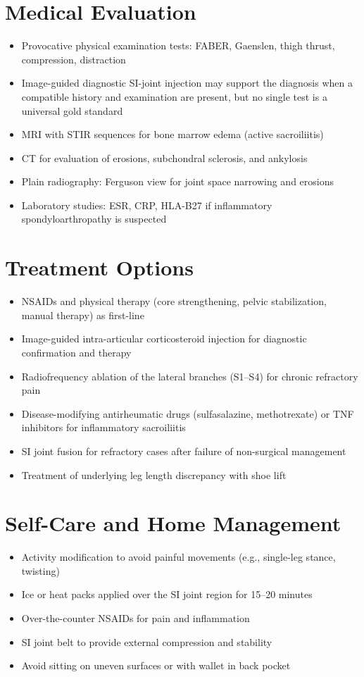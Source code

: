 \section*{Medical Evaluation}
\begin{itemize}
  \item Provocative physical examination tests: FABER, Gaenslen, thigh thrust, compression, distraction
  \item Image-guided diagnostic SI-joint injection may support the diagnosis when a compatible history and examination are present, but no single test is a universal gold standard
  \item MRI with STIR sequences for bone marrow edema (active sacroiliitis)
  \item CT for evaluation of erosions, subchondral sclerosis, and ankylosis
  \item Plain radiography: Ferguson view for joint space narrowing and erosions
  \item Laboratory studies: ESR, CRP, HLA-B27 if inflammatory spondyloarthropathy is suspected
\end{itemize}

\section*{Treatment Options}
\begin{itemize}
  \item NSAIDs and physical therapy (core strengthening, pelvic stabilization, manual therapy) as first-line
  \item Image-guided intra-articular corticosteroid injection for diagnostic confirmation and therapy
  \item Radiofrequency ablation of the lateral branches (S1--S4) for chronic refractory pain
  \item Disease-modifying antirheumatic drugs (sulfasalazine, methotrexate) or TNF inhibitors for inflammatory sacroiliitis
  \item SI joint fusion for refractory cases after failure of non-surgical management
  \item Treatment of underlying leg length discrepancy with shoe lift
\end{itemize}

\section*{Self-Care and Home Management}
\begin{itemize}
  \item Activity modification to avoid painful movements (e.g., single-leg stance, twisting)
  \item Ice or heat packs applied over the SI joint region for 15--20 minutes
  \item Over-the-counter NSAIDs for pain and inflammation
  \item SI joint belt to provide external compression and stability
  \item Avoid sitting on uneven surfaces or with wallet in back pocket
\end{itemize}

